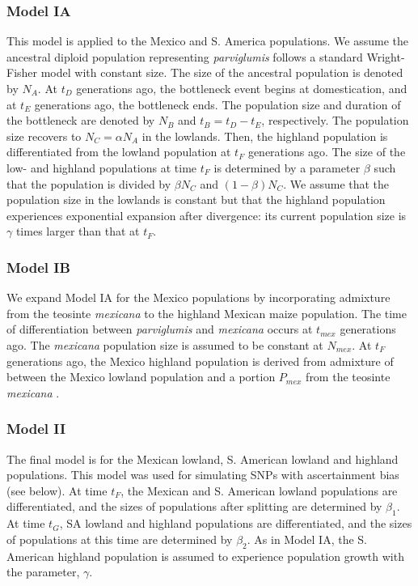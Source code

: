 \subsubsection{Model IA}
This model is applied to the Mexico and S. America populations.
We assume the ancestral diploid population representing \emph{parviglumis} follows a standard Wright-Fisher model with constant size.  
The size of the ancestral population is denoted by $N_A$.
At $t_D$ generations ago, the bottleneck event begins at domestication, and at $t_E$ generations ago, the bottleneck ends.  
The population size and duration of the bottleneck are denoted by $N_B$ and $t_B=t_D-t_E$, respectively.  
The population size recovers to $N_C=\alpha N_A$ in the lowlands.  
Then, the highland population is differentiated from the lowland population at $t_F$ generations ago.  
The size of the low- and highland populations at time $t_F$ is determined by a parameter $\beta$ such that the population is divided by $\beta N_C$ and $(1-\beta)N_C$.  
We assume that the population size in the lowlands is constant but that the highland population experiences exponential expansion after divergence: its current population size is $\gamma$ times larger than that at $t_F$.  \\

\subsubsection{Model IB}
We expand Model IA for the Mexico populations by incorporating admixture from the teosinte \emph{mexicana} to the highland Mexican maize population.  
The time of differentiation between \emph{parviglumis} and \emph{mexicana} occurs at $t_{mex}$ generations ago.  
The \emph{mexicana} population size is assumed to be constant at $N_{mex}$.  
At $t_F$ generations ago, the Mexico highland population is derived from admixture of between the Mexico lowland population and a portion $P_{mex}$ from the teosinte \emph{mexicana} .  \\

\subsubsection{Model II}
The final model is for the Mexican lowland, S. American lowland and highland populations.  
This model was used for simulating SNPs with ascertainment bias (see below).  
At time $t_F$, the Mexican and S. American lowland populations are differentiated, and the sizes of populations after splitting are determined by $\beta_1$.  
At time $t_G$, SA lowland and highland populations are differentiated, and the sizes of populations at this time are determined by $\beta_2$.  
As in Model IA, the S. American highland population is assumed to experience population growth with the parameter, $\gamma$.\\

